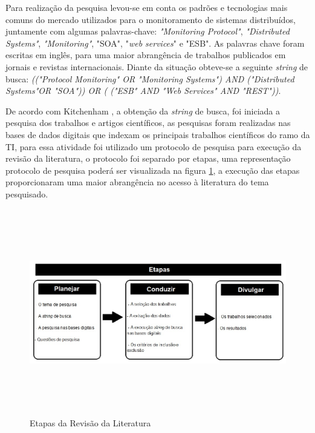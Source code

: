 Para realização da pesquisa levou-se em conta os padrões e tecnologias mais comuns do mercado utilizados para o monitoramento de sistemas distribuídos, juntamente com algumas palavras-chave: \textit{"Monitoring Protocol"}, \textit{"Distributed Systems"}, \textit{"Monitoring"}, "\acrshort{SOA}", "\textit{web services}" e "\acrshort{ESB}". As palavras chave foram escritas em inglês, para uma maior abrangência de trabalhos publicados em jornais e revistas internacionais. Diante da situação obteve-se a seguinte \textit{string} de busca: \textit{(("Protocol Monitoring" OR "Monitoring Systems") AND ("Distributed Systems"OR "SOA")) OR ( ("ESB" AND "Web Services" AND "REST"))}.

De acordo com Kitchenham \cite{kitchenham2007guidelines}, a obtenção da \textit{string} de busca, foi iniciada a pesquisa dos trabalhos e artigos científicos, as pesquisas foram realizadas nas bases de dados digitais que indexam os principais trabalhos científicos do ramo da \acrlong{TI}, para essa atividade foi utilizado um protocolo de pesquisa para execução da revisão da literatura, o protocolo foi separado por etapas, uma representação protocolo de pesquisa poderá ser visualizada na figura \ref{fig:etapasRSL}, a execução das etapas proporcionaram uma maior abrangência no acesso à literatura do tema pesquisado.

\begin{figure}[!ht]
\centering
\includegraphics[width = 16cm, height=9cm]{img/etapas_RSL_final.jpg}
\caption{Etapas da Revisão da Literatura \cite{brereton2007lessons}}
\label{fig:etapasRSL}
\end{figure}


